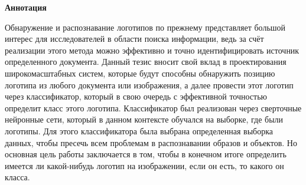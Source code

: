 \newpage
\pagestyle{plain}

{
\begin{center}
    \Large
    \textbf{Аннотация}
\end{center}
Обнаружение и распознавание логотипов по прежнему представляет большой интерес для исследователей в области поиска информации, ведь за счёт реализации этого метода можно эффективно и точно идентифицировать источник определенного документа. Данный тезис вносит свой вклад в проектирования широкомасштабных систем, которые будут способны обнаружить позицию логотипа из любого документа или изображения, а далее провести этот логотип через классификатор, который в свою очередь с эффективной точностью определит класс этого логотипа. Классификатор был реализован через сверточные нейронные сети, который в данном контексте обучался на выборке, где были логотипы. Для этого классификатора была выбрана определенная выборка данных, чтобы пресечь всем проблемам в распознавании образов и объектов. Но основная цель работы заключается в том, чтобы в конечном итоге определить имеется ли какой-нибудь логотип на изображении, если он есть, то какого он класса.
}